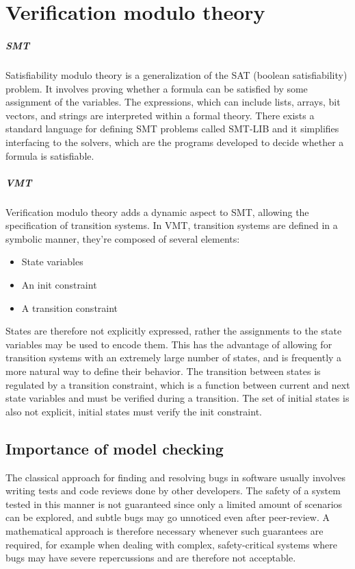 \chapter{Verification modulo theory}

\paragraph*{SMT}
Satisfiability modulo theory is a generalization of the SAT (boolean satisfiability) problem. It involves proving whether a formula can be satisfied by some assignment of the variables. The expressions, which can include lists, arrays, bit vectors, and strings are interpreted within a formal theory. There exists a standard language for defining SMT problems called SMT-LIB \cite{SMT-LIB} and it simplifies interfacing to the solvers, which are the programs developed to decide whether a formula is satisfiable.

\paragraph*{VMT}
Verification modulo theory adds a dynamic aspect to SMT, allowing the specification of transition systems. In VMT, transition systems are defined in a symbolic manner, they're composed of several elements:
\begin{itemize}
    \item State variables
    \item An init constraint
    \item A transition constraint
\end{itemize}
States are therefore not explicitly expressed, rather the assignments to the state variables may be used to encode them.
This has the advantage of allowing for transition systems with an extremely large number of states, and is frequently a more natural way to define their behavior.
The transition between states is regulated by a transition constraint, which is a function between current and next state variables and must be verified during a transition. The set of initial states is also not explicit, initial states must verify the init constraint.


\section{Importance of model checking}
The classical approach for finding and resolving bugs in software usually involves writing tests and code reviews done by other developers.
The safety of a system tested in this manner is not guaranteed since only a limited amount of scenarios can be explored, and subtle bugs may go unnoticed even after peer-review.
A mathematical approach is therefore necessary whenever such guarantees are required, for example when dealing with complex, safety-critical systems where bugs may have severe repercussions and are therefore not acceptable.

